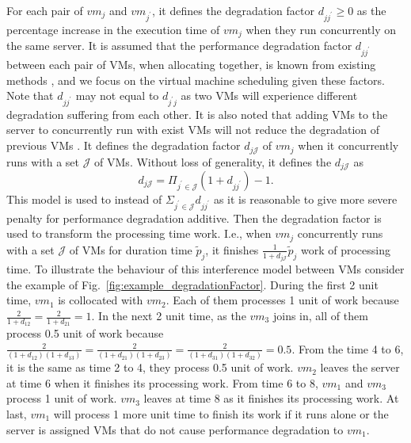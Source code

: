 \documentclass[10pt,journal]{IEEEtran}
\begin{document}
For each pair of $vm_j$ and $vm_{j^{'}}$, it defines the degradation factor $d_{jj^{'}}{\geq}0$ as the percentage increase in the execution time of $vm_j$ when they run concurrently on the same server. It is assumed that the performance degradation factor $d_{jj^{'}}$ between each pair of VMs, when allocating together, is known from existing methods \cite{Govindan11, Mars11, Roytman13, Verboven13, Koh07}, and we focus on the virtual machine scheduling given these factors. Note that $d_{jj^{'}}$ may not equal to $d_{j^{'}j}$ as two VMs will experience different degradation suffering from each other. It is also noted that adding VMs to the server to concurrently run with exist VMs will not reduce the degradation of previous VMs \cite{Roytman13}. It defines the degradation factor $d_{j\mathcal{J}}$ of $vm_j$ when it concurrently runs with a set $\mathcal{J}$ of VMs. Without loss of generality, it defines the $d_{j\mathcal{J}}$ as
\begin{equation}
d_{j\mathcal{J}}=\Pi_{j^{'}\in{\mathcal{J}}}(1+d_{jj^{'}})-1.
\end{equation}
This model is used to instead of $\Sigma_{j^{'}\in{\mathcal{J}}}d_{jj^{'}}$ as it is reasonable to give more severe penalty for performance degradation additive. Then the degradation factor is used to transform the processing time work. I.e., when $vm_j$ concurrently runs with a set $\mathcal{J}$ of VMs for duration time $\widetilde{p}_j$, it finishes $\frac{1}{1+d_{j\mathcal{J}}}\widetilde{p}_j$ work of processing time. To illustrate the behaviour of this interference model between VMs consider the example of Fig.~\ref{fig:example_degradationFactor}. During the first 2 unit time, $vm_1$ is collocated with $vm_2$. Each of them processes 1 unit of work because $\frac{2}{1+d_{12}}=\frac{2}{1+d_{21}}=1$. In the next 2 unit time, as the $vm_3$ joins in, all of them process 0.5 unit of work because $\frac{2}{(1+d_{12})(1+d_{13})}=\frac{2}{(1+d_{21})(1+d_{23})}=\frac{2}{(1+d_{31})(1+d_{32})}=0.5$. From the time 4 to 6, it is the same as time 2 to 4, they process 0.5 unit of work. $vm_2$ leaves the server at time 6 when it finishes its processing work. From time 6 to 8, $vm_1$ and $vm_3$ process 1 unit of work. $vm_3$ leaves at time 8 as it finishes its processing work. At last, $vm_1$ will process 1 more unit time to finish its work if it runs alone or the server is assigned VMs that do not cause performance degradation to $vm_1$.
\end{document}
